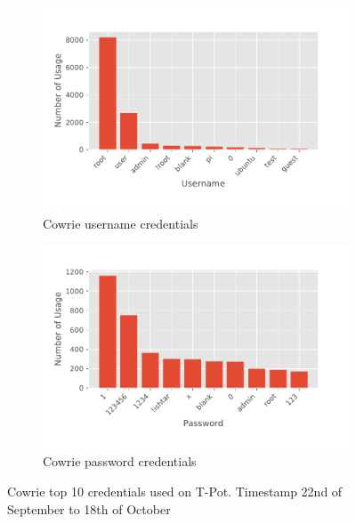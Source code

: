 \begin{figure}
    
\end{figure}

\begin{figure}
    
\end{figure}

\begin{figure}
    \centering

    \begin{subfigure}[b]{0.49\textwidth}
        \centering
        \includegraphics[width=\textwidth]{figures/tpot-cowrie-username.pdf}
        \caption{Cowrie username credentials}
        \label{fig:tpot-cowrie-username}
    \end{subfigure}
    \hfill
    \begin{subfigure}[b]{0.49\textwidth}
        \centering
        \includegraphics[width=\textwidth]{figures/tpot-cowrie-password.pdf}
        \caption{Cowrie password credentials}
        \label{fig:tpot-cowrie-password}
    \end{subfigure}
    \caption[Cowrie top 10 credentials on T-Pot]{Cowrie top 10 credentials used on T-Pot. Timestamp 22nd of September to 18th of October}
    \label{fig:cowrie-credentials}
\end{figure}

